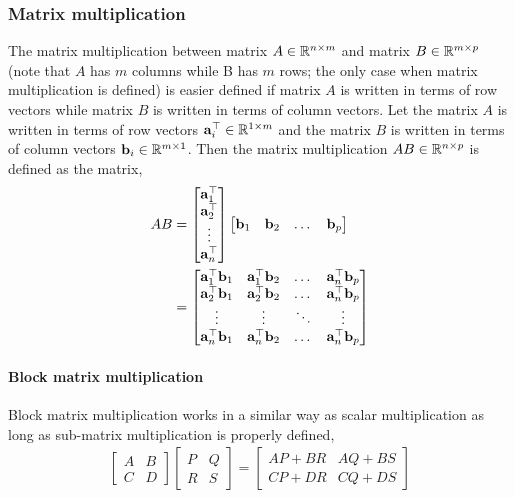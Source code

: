 \documentclass[twocolumn]{article}
\begin{document}
\subsubsection{Matrix multiplication}
The matrix multiplication between  matrix  $A \in \mathbb{R}^{n  \times m}$   and
matrix $B  \in \mathbb{R}^{m \times p}$ (note that $A$ has $m$ columns while B has $m$
rows;  the only case when matrix multiplication  is defined) is easier 
defined if matrix $A$  is written in terms  of row vectors while  matrix  $B$ is
written  in  terms  of column vectors. Let  the  matrix $A$  is written in terms
of row   vectors $\mathbf{a}_i^\top   \in \mathbb{R}^{1 \times m}$ and the matrix $B$ is written in terms of column
vectors $\mathbf{b}_i \in \mathbb{R}^{m \times  1}$. Then the matrix multiplication $AB \in
\mathbb{R}^{n \times  p}$ is defined as the matrix,
%
\begin{align}
  AB &= \begin{bmatrix}
    \mathbf{a}_1^\top
    \\
    \mathbf{a}_2^\top
    \\
    \vdots
    \\
    \mathbf{a}_n^\top
    \end{bmatrix}
  \begin{bmatrix}
    \mathbf{b}_1
    &
    \mathbf{b}_2
    &
    \dots
    &
    \mathbf{b}_p
  \end{bmatrix}
      \\
  &= \begin{bmatrix}
    \mathbf{a}_1^\top\mathbf{b}_1 & \mathbf{a}_1^\top\mathbf{b}_2 &  \dots & \mathbf{a}_n^\top \mathbf{b}_p
    \\
    \mathbf{a}_2^\top\mathbf{b}_1 & \mathbf{a}_2^\top\mathbf{b}_2 &  \dots & \mathbf{a}_n^\top \mathbf{b}_p
    \\
    \vdots &  \vdots  &  \ddots  &   \vdots
    \\
    \mathbf{a}_n^\top\mathbf{b}_1 & \mathbf{a}_n^\top\mathbf{b}_2 &  \dots & \mathbf{a}_n^\top \mathbf{b}_p
    \end{bmatrix}
\end{align}

\paragraph{Block matrix  multiplication}
Block matrix multiplication works in a similar way  as scalar multiplication as
long as sub-matrix multiplication is properly defined,
%
\begin{align}
  \begin{bmatrix}  A & B \\  C &  D \end{bmatrix}
  \begin{bmatrix}  P & Q \\  R &  S \end{bmatrix}
 =
   \begin{bmatrix}  AP+BR & AQ+BS \\  CP+DR &  CQ+DS \end{bmatrix}
  \end{align}
\end{document}
